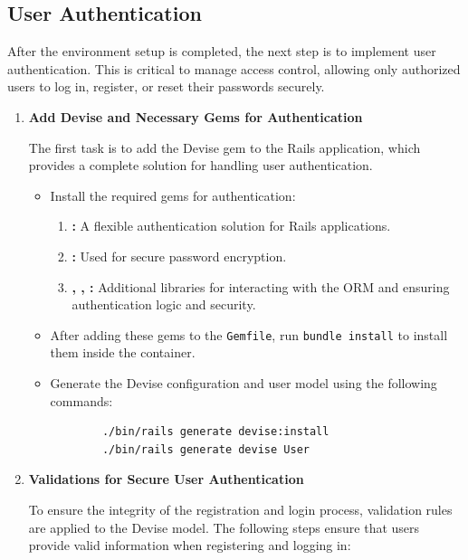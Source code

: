 \subsection{User Authentication}
After the environment setup is completed, the next step is to implement user authentication. This is critical to manage access control, allowing only authorized users to log in, register, or reset their passwords securely.

\begin{enumerate}
    \item \textbf{Add Devise and Necessary Gems for Authentication}

    The first task is to add the Devise gem to the Rails application, which provides a complete solution for handling user authentication.

    \begin{itemize}
        \item Install the required gems for authentication:
        \begin{enumerate}
            \item \textbf{\citeauthor{devise2024}:} A flexible authentication solution for Rails applications.
            \item \textbf{\citeauthor{bcrypt2024}:} Used for secure password encryption.
            \item \textbf{\citeauthor{ormadapter2024}, \citeauthor{railties2024}, \citeauthor{warden2024}:} Additional libraries for interacting with the ORM and ensuring authentication logic and security.
        \end{enumerate}

        \item After adding these gems to the \texttt{Gemfile}, run \texttt{bundle install} to install them inside the container.

        \item Generate the Devise configuration and user model using the following commands:
\begin{lstlisting}
        ./bin/rails generate devise:install
        ./bin/rails generate devise User
\end{lstlisting}
    \end{itemize}

    \item \textbf{Validations for Secure User Authentication}

    To ensure the integrity of the registration and login process, validation rules are applied to the Devise model. The following steps ensure that users provide valid information when registering and logging in:


\end{enumerate}
